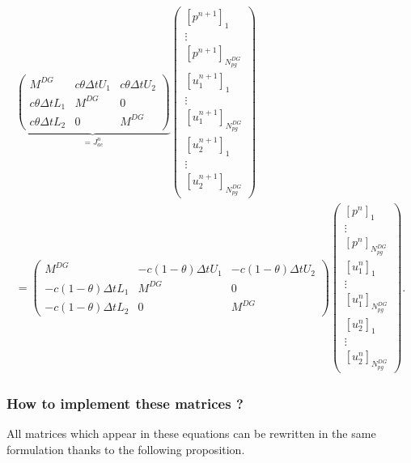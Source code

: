 \documentclass[a4paper, 11pt]{report}
\begin{document}
\begin{multline}
\underbrace{\begin{pmatrix}
M^{DG}& c\theta\Delta t U_1 & c\theta\Delta t U_2\\
c\theta\Delta t L_1 & M^{DG}&0\\
c\theta\Delta t L_2&0&M^{DG}
\end{pmatrix}}_{=J_{ac}^n}\begin{pmatrix}\left[p^{n+1}\right]_1\\ \vdots \\ \left[p^{n+1}\right]_{N_{pg}^{DG}}\\ \left[u_1^{n+1}\right]_1\\ \vdots \\ \left[u_1^{n+1}\right]_{N_{pg}^{DG}}\\ \left[u_2^{n+1}\right]_1\\ \vdots  \\ \left[u_2^{n+1}\right]_{N_{pg}^{DG}}\end{pmatrix}\\=\begin{pmatrix}
M^{DG}& -c(1-\theta)\Delta t U_1 & -c(1-\theta)\Delta t U_2\\
-c(1-\theta)\Delta t L_1 & M^{DG}&0\\
-c(1-\theta)\Delta t L_2&0&M^{DG}
\end{pmatrix}\begin{pmatrix}\left[p^{n}\right]_1\\ \vdots \\ \left[p^{n}\right]_{N_{pg}^{DG}}\\ \left[u_1^{n}\right]_1\\ \vdots \\ \left[u_1^{n}\right]_{N_{pg}^{DG}}\\ \left[u_2^{n}\right]_1\\ \vdots  \\ \left[u_2^{n}\right]_{N_{pg}^{DG}}\end{pmatrix}.
\label{EQ_FINALES_SANS_ACCROISSEMENT}
\end{multline}




\subsubsection{How to implement these matrices ?}
All matrices which appear in these equations can be rewritten in the same formulation thanks to the following proposition.
\end{document}
